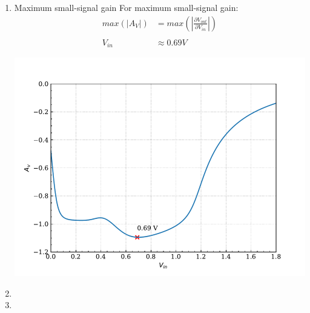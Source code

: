 \documentclass{article}
\begin{document}
\begin{enumerate}
\item Maximum small-signal gain
For maximum small-signal gain:
\begin{equation*}
\begin{align}
max(|A_{V}|) &= max(|\frac{\partial{V_{out}}}{\partial{V_{in}}}|) \\
\\
V_{in} &\approx 0.69 V
\end{align}
\end{equation*}
\begin{center}
\includegraphics[width=.9\linewidth]{img/q7/c/cir1-d-vout.pdf}
\end{center}
\item 

\item 
\end{enumerate}
\end{document}
